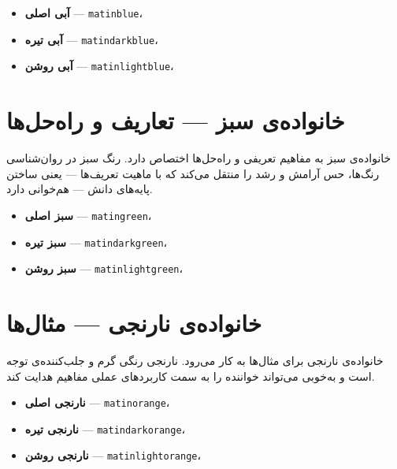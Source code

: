 \documentclass{matinbook}
\begin{document}
\begin{itemize}
    \item \textcolor{matinblue}{\textbf{آبی اصلی}} — \texttt{matinblue}،
    \item \textcolor{matindarkblue}{\textbf{آبی تیره}} — \texttt{matindarkblue}،
    \item \colorbox{matinlightblue}{\textbf{آبی روشن}} — \texttt{matinlightblue}،
\end{itemize}

\section{خانواده‌ی سبز — تعاریف و راه‌حل‌ها}
\label{sec:color-green}

خانواده‌ی سبز به مفاهیم تعریفی و راه‌حل‌ها اختصاص دارد. رنگ سبز
در روان‌شناسی رنگ‌ها، حس آرامش و رشد را منتقل می‌کند که با
ماهیت تعریف‌ها — یعنی ساختن پایه‌های دانش — هم‌خوانی دارد.

\begin{itemize}
    \item \textcolor{matingreen}{\textbf{سبز اصلی}} — \texttt{matingreen}،
    \item \textcolor{matindarkgreen}{\textbf{سبز تیره}} — \texttt{matindarkgreen}،
    \item \colorbox{matinlightgreen}{\textbf{سبز روشن}} — \texttt{matinlightgreen}،
\end{itemize}

\section{خانواده‌ی نارنجی — مثال‌ها}
\label{sec:color-orange}

خانواده‌ی نارنجی برای مثال‌ها به کار می‌رود. نارنجی رنگی
گرم و جلب‌کننده‌ی توجه است و به‌خوبی می‌تواند خواننده را به
سمت کاربردهای عملی مفاهیم هدایت کند.

\begin{itemize}
    \item \textcolor{matinorange}{\textbf{نارنجی اصلی}} — \texttt{matinorange}،
    \item \textcolor{matindarkorange}{\textbf{نارنجی تیره}} — \texttt{matindarkorange}،
    \item \colorbox{matinlightorange}{\textbf{نارنجی روشن}} — \texttt{matinlightorange}،
\end{itemize}
\end{document}
